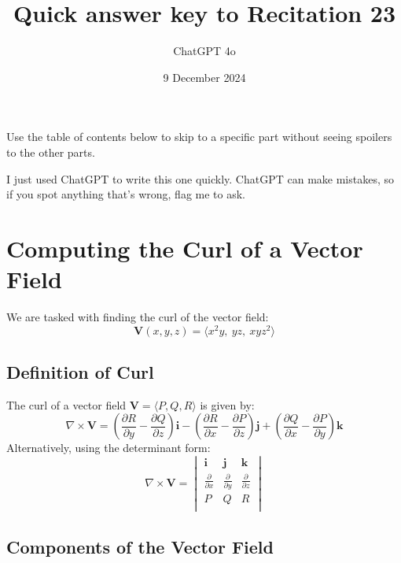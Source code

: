 \documentclass[11pt]{article}
\begin{document}
\title{Quick answer key to Recitation 23}
\author{ChatGPT 4o}
\date{9 December 2024}
\maketitle

Use the table of contents below to skip to a specific part
without seeing spoilers to the other parts.

I just used ChatGPT to write this one quickly.
ChatGPT can make mistakes, so if you spot anything that's wrong, flag me to ask.

\tableofcontents



\newpage

\section{Computing the Curl of a Vector Field}

We are tasked with finding the curl of the vector field:
\[
\mathbf{V}(x, y, z) = \langle x^2 y, \ yz, \ x y z^2 \rangle
\]

\newpage

\subsection{Definition of Curl}

The curl of a vector field \( \mathbf{V} = \langle P, Q, R \rangle \) is given by:
\[
\nabla \times \mathbf{V} = \left( \frac{\partial R}{\partial y} - \frac{\partial Q}{\partial z} \right) \mathbf{i} - \left( \frac{\partial R}{\partial x} - \frac{\partial P}{\partial z} \right) \mathbf{j} + \left( \frac{\partial Q}{\partial x} - \frac{\partial P}{\partial y} \right) \mathbf{k}
\]
Alternatively, using the determinant form:
\[
\nabla \times \mathbf{V} = 
\begin{vmatrix}
\mathbf{i} & \mathbf{j} & \mathbf{k} \\
\frac{\partial}{\partial x} & \frac{\partial}{\partial y} & \frac{\partial}{\partial z} \\
P & Q & R \\
\end{vmatrix}
\]

\newpage

\subsection{Components of the Vector Field}
\end{document}
